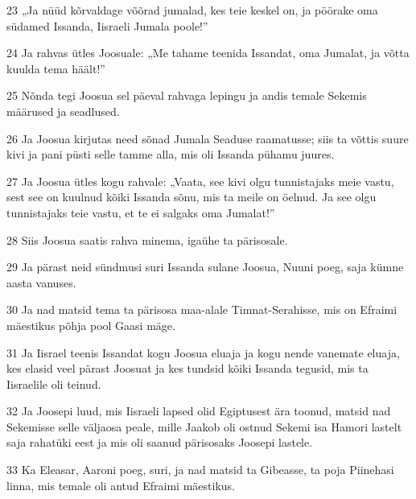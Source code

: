 \par 23 „Ja nüüd kõrvaldage võõrad jumalad, kes teie keskel on, ja pöörake oma südamed Issanda, Iisraeli Jumala poole!”
\par 24 Ja rahvas ütles Joosuale: „Me tahame teenida Issandat, oma Jumalat, ja võtta kuulda tema häält!”
\par 25 Nõnda tegi Joosua sel päeval rahvaga lepingu ja andis temale Sekemis määrused ja seadlused.
\par 26 Ja Joosua kirjutas need sõnad Jumala Seaduse raamatusse; siis ta võttis suure kivi ja pani püsti selle tamme alla, mis oli Issanda pühamu juures.
\par 27 Ja Joosua ütles kogu rahvale: „Vaata, see kivi olgu tunnistajaks meie vastu, sest see on kuulnud kõiki Issanda sõnu, mis ta meile on öelnud. Ja see olgu tunnistajaks teie vastu, et te ei salgaks oma Jumalat!”
\par 28 Siis Joosua saatis rahva minema, igaühe ta pärisosale.
\par 29 Ja pärast neid sündmusi suri Issanda sulane Joosua, Nuuni poeg, saja kümne aasta vanuses.
\par 30 Ja nad matsid tema ta pärisosa maa-alale Timnat-Serahisse, mis on Efraimi mäestikus põhja pool Gaasi mäge.
\par 31 Ja Iisrael teenis Issandat kogu Joosua eluaja ja kogu nende vanemate eluaja, kes elasid veel pärast Joosuat ja kes tundsid kõiki Issanda tegusid, mis ta Iisraelile oli teinud.
\par 32 Ja Joosepi luud, mis Iisraeli lapsed olid Egiptusest ära toonud, matsid nad Sekemisse selle väljaosa peale, mille Jaakob oli ostnud Sekemi isa Hamori lastelt saja rahatüki eest ja mis oli saanud pärisosaks Joosepi lastele.
\par 33 Ka Eleasar, Aaroni poeg, suri, ja nad matsid ta Gibeasse, ta poja Piinehasi linna, mis temale oli antud Efraimi mäestikus.




